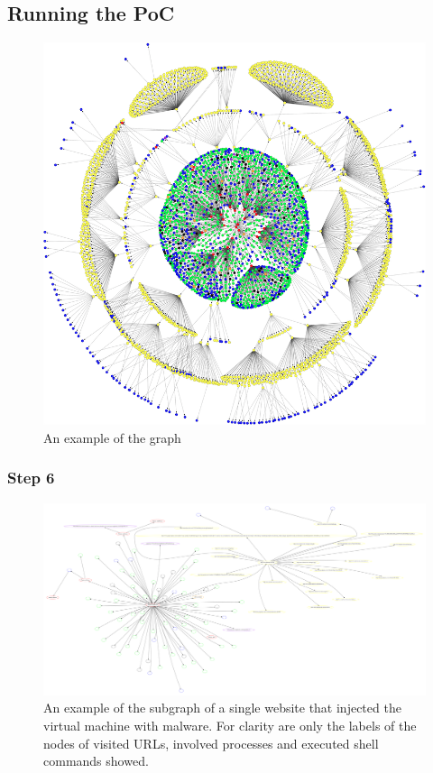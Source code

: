 \subsection{Running the PoC}
\begin{figure}[h]
    \centering
    \includegraphics[width=17cm]{Images/graph2.png}
    \caption{An example of the graph}
    \label{fig:graph}
\end{figure}
\subsubsection{Step 6}
\begin{figure}[h]
    \centering
    \includegraphics[width=25cm, angle=90]{Images/report_Subprocess_from_tab}
    \caption{An example of the subgraph of a single website that injected the virtual machine with malware. For clarity are only the labels of the nodes of visited URLs, involved processes and executed shell commands showed.}
    \label{fig:subgraph}
\end{figure}

\restoregeometry
{}

